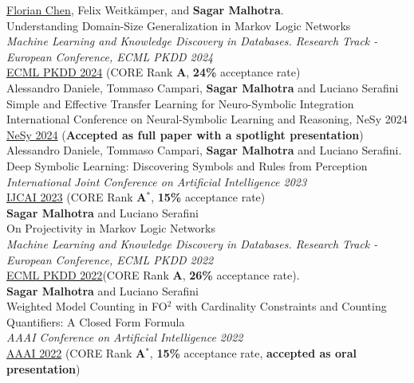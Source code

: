 \documentclass[10pt, a4paper]{article}
\newcommand{\years}[1]{\marginnote{\scriptsize #1}}
\begin{document}
\years{2024}\underline{Florian Chen}, Felix Weitkämper, and \textbf{Sagar Malhotra}.\\
Understanding Domain-Size Generalization in Markov Logic Networks\\
\emph{Machine Learning and Knowledge Discovery in Databases. Research Track - European Conference, ECML PKDD 2024} \\
\href{https://arxiv.org/abs/2403.15933}{ECML PKDD 2024} (CORE Rank \textbf{A}, \textbf{24\%} acceptance rate)\\

\years{2024}Alessandro Daniele, Tommaso Campari, \textbf{Sagar Malhotra} and Luciano Serafini\\
Simple and Effective Transfer Learning for Neuro-Symbolic Integration\\
International Conference on Neural-Symbolic Learning and Reasoning, NeSy 2024\\
\href{https://arxiv.org/abs/2402.14047}{NeSy 2024} (\textbf{Accepted as full paper with a spotlight presentation})\\ 

\years{2023}Alessandro Daniele, Tommaso Campari, \textbf{Sagar Malhotra} and Luciano Serafini. \\ Deep Symbolic Learning: Discovering Symbols and Rules from Perception \\ 
\emph{International Joint Conference on Artificial Intelligence 2023}\\
\href{https://www.ijcai.org/proceedings/2023/400}{IJCAI 2023} (CORE Rank \textbf{A$^{*}$}, \textbf{15\%} acceptance rate)\\ 


\years{2022}\textbf{Sagar Malhotra} and Luciano Serafini\\
 On Projectivity in Markov Logic Networks \\ \emph{Machine Learning and Knowledge Discovery in Databases. Research Track - European Conference, ECML PKDD 2022} \\  
\href{https://link.springer.com/chapter/10.1007/978-3-031-26419-1_14}{ECML PKDD 2022}(CORE Rank \textbf{A}, \textbf{26\%} acceptance rate).\\ 


\years{2022}\textbf{Sagar Malhotra} and Luciano Serafini\\ 
Weighted Model Counting in FO$^2$ with Cardinality Constraints and Counting Quantifiers: A Closed Form Formula \\ \emph{AAAI Conference on Artificial Intelligence 2022}\\
\href{https://ojs.aaai.org/index.php/AAAI/article/view/20525}{AAAI 2022} (CORE Rank \textbf{A$^{*}$}, \textbf{15\%} acceptance rate, \textbf{accepted as oral presentation}) \\
\end{document}
